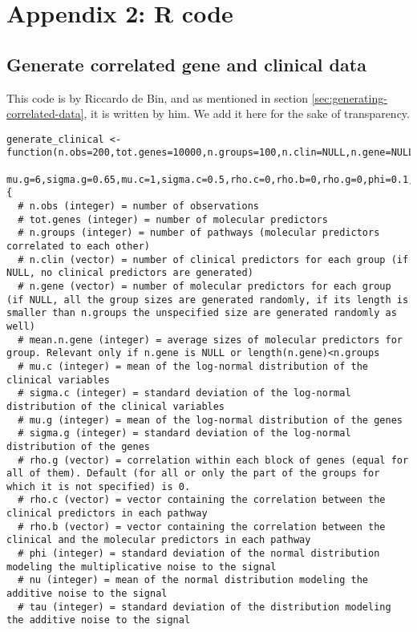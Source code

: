 \chapter{Appendix 2: R code}\label{appendix2}

\section{Generate correlated gene and clinical data}
This code is by Riccardo de Bin, and as mentioned in section \ref{sec:generating-correlated-data}, it is written by him.
We add it here for the sake of transparency.

\label{code:generate-correlated-data}
\begin{lstlisting}
generate_clinical <- function(n.obs=200,tot.genes=10000,n.groups=100,n.clin=NULL,n.gene=NULL,mean.n.gene=15,
                        mu.g=6,sigma.g=0.65,mu.c=1,sigma.c=0.5,rho.c=0,rho.b=0,rho.g=0,phi=0.1,nu=10,tau=20) {
  # n.obs (integer) = number of observations
  # tot.genes (integer) = number of molecular predictors
  # n.groups (integer) = number of pathways (molecular predictors correlated to each other)
  # n.clin (vector) = number of clinical predictors for each group (if NULL, no clinical predictors are generated)
  # n.gene (vector) = number of molecular predictors for each group (if NULL, all the group sizes are generated randomly, if its length is smaller than n.groups the unspecified size are generated randomly as well)
  # mean.n.gene (integer) = average sizes of molecular predictors for group. Relevant only if n.gene is NULL or length(n.gene)<n.groups
  # mu.c (integer) = mean of the log-normal distribution of the clinical variables
  # sigma.c (integer) = standard deviation of the log-normal distribution of the clinical variables
  # mu.g (integer) = mean of the log-normal distribution of the genes
  # sigma.g (integer) = standard deviation of the log-normal distribution of the genes
  # rho.g (vector) = correlation within each block of genes (equal for all of them). Default (for all or only the part of the groups for which it is not specified) is 0.
  # rho.c (vector) = vector containing the correlation between the clinical predictors in each pathway
  # rho.b (vector) = vector containing the correlation between the clinical and the molecular predictors in each pathway
  # phi (integer) = standard deviation of the normal distribution modeling the multiplicative noise to the signal
  # nu (integer) = mean of the normal distribution modeling the additive noise to the signal
  # tau (integer) = standard deviation of the distribution modeling the additive noise to the signal


\end{lstlisting}
